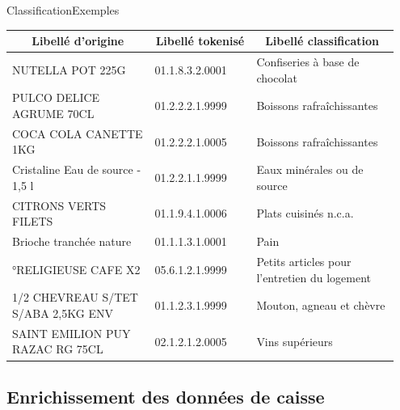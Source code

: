 \documentclass[ignorenonframetext,]{beamer}
\begin{document}
\begin{frame}{Classification}{Exemples}

\begin{footnotesize}
\begin{tabular}{p{0.35\linewidth}p{0.25\linewidth}p{0.35\linewidth}}
\toprule
                \multicolumn{1}{c}{\textbf{Libellé d'origine}} & \multicolumn{1}{c}{\textbf{Libellé tokenisé}}        &          \multicolumn{1}{c}{\textbf{Libellé classification}} \\
\midrule
                  NUTELLA POT 225G &     01.1.8.3.2.0001 &               Confiseries à base de chocolat \\
\rowcolor{LightCyan}
          PULCO DELICE AGRUME 70CL &     01.2.2.2.1.9999 &                    Boissons rafraîchissantes \\
             COCA COLA CANETTE 1KG &     01.2.2.2.1.0005 &                    Boissons rafraîchissantes \\
\rowcolor{LightCyan}
  Cristaline Eau de source - 1,5 l &     01.2.2.1.1.9999 &                  Eaux minérales ou de source \\
              CITRONS VERTS FILETS &     01.1.9.4.1.0006 &                        Plats cuisinés n.c.a. \\
\rowcolor{LightCyan}
           Brioche tranchée nature &     01.1.1.3.1.0001 &                                         Pain \\
               °RELIGIEUSE CAFE X2 &     05.6.1.2.1.9999 & Petits articles pour l'entretien du logement \\
\rowcolor{LightCyan}
1/2 CHEVREAU S/TET S/ABA 2,5KG ENV &     01.1.2.3.1.9999 &                     Mouton, agneau et chèvre \\
   SAINT EMILION PUY RAZAC RG 75CL &     02.1.2.1.2.0005 &                              Vins supérieurs \\
\bottomrule
\end{tabular}
\end{footnotesize}


\end{frame}


\subsection{Enrichissement des données de caisse}
\end{document}
